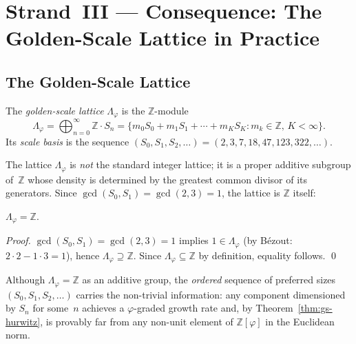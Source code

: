 \section{Strand~III — Consequence: The Golden-Scale Lattice in Practice}
\label{sec:gs-consequence}

\subsection{The Golden-Scale Lattice}
\label{subsec:gs-lattice}

\begin{definition}\label{def:gs-lattice}
The \emph{golden-scale lattice} \(\Lambda_\varphi\) is the
\(\mathbb{Z}\)-module
\[
  \Lambda_\varphi
  = \bigoplus_{n=0}^{\infty} \mathbb{Z} \cdot S_n
  = \{ m_0 S_0 + m_1 S_1 + \cdots + m_K S_K : m_k \in \mathbb{Z},\, K < \infty \} .
\]
Its \emph{scale basis} is the sequence \((S_0, S_1, S_2, \ldots) =
(2, 3, 7, 18, 47, 123, 322, \ldots)\).
\end{definition}

The lattice \(\Lambda_\varphi\) is \emph{not} the standard integer
lattice; it is a proper additive subgroup of~\(\mathbb{Z}\) whose
density is determined by the greatest common divisor of its
generators.  Since \(\gcd(S_0, S_1) = \gcd(2,3) = 1\), the lattice
is \(\mathbb{Z}\) itself:

\begin{lemma}\label{lem:gs-lattice-density}
\(\Lambda_\varphi = \mathbb{Z}\).
\end{lemma}

\begin{proof}
\(\gcd(S_0, S_1) = \gcd(2, 3) = 1\) implies
\(1 \in \Lambda_\varphi\) (by Bézout: \(2 \cdot 2 - 1 \cdot 3 = 1\)),
hence \(\Lambda_\varphi \supseteq \mathbb{Z}\).  Since
\(\Lambda_\varphi \subseteq \mathbb{Z}\) by definition, equality
follows.
\qed
\end{proof}

Although \(\Lambda_\varphi = \mathbb{Z}\) as an additive group, the
\emph{ordered} sequence of preferred sizes
\((S_0, S_1, S_2, \ldots)\) carries the non-trivial information: any
component dimensioned by \(S_n\) for some~\(n\) achieves a
\(\varphi\)-graded growth rate and, by Theorem~\ref{thm:gs-hurwitz},
is provably far from any non-unit element of \(\mathbb{Z}[\varphi]\)
in the Euclidean norm.

